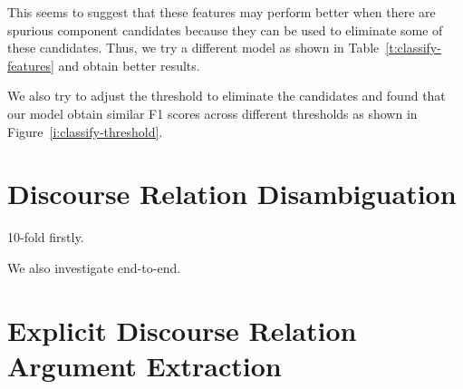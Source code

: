 

This seems to suggest that these features may perform better when there are
spurious component candidates because they can be used to eliminate some of
these candidates.  Thus, we try a different model as shown in
Table~\ref{t:classify-features} and obtain better results.



We also try to adjust the threshold to eliminate the candidates and found
that our model obtain similar F1 scores across different thresholds as
shown in Figure~\ref{i:classify-threshold}.



\section{Discourse Relation Disambiguation}

10-fold firstly.

We also investigate end-to-end.


\section{Explicit Discourse Relation Argument Extraction}
